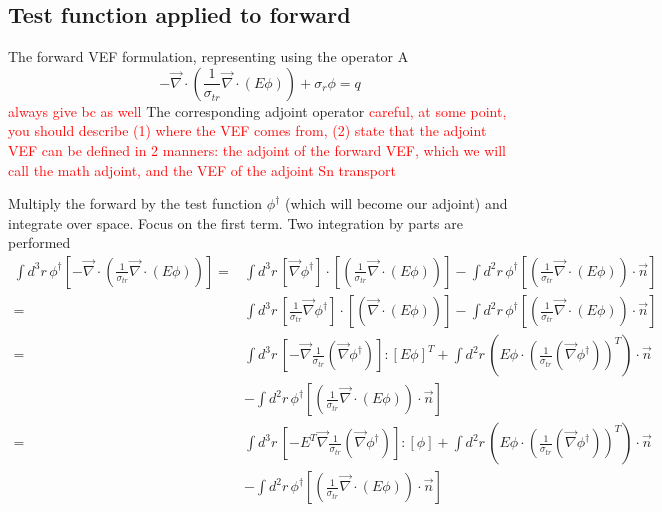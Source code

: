 \documentclass{article}
\newcommand{\vdiv}{\vec{\nabla} \cdot}
\newcommand{\vgrad}{\vec{\nabla}}
\begin{document}
\subsection{Test function applied to forward}
The forward VEF formulation, representing using the operator A
\[ -\vdiv \left( \frac{1}{\sigma_{tr}} \vdiv \left( E \phi \right) \right)
+ \sigma_r \phi
= q
\]
\textcolor{red}{always give bc as well}
The corresponding adjoint operator \textcolor{red}{careful, at some point, you should describe (1) where the VEF comes from, (2) state that the adjoint VEF can be defined in 2 manners: the adjoint of the forward VEF, which we will call the math adjoint, and the VEF of the adjoint Sn transport}


Multiply the forward by the test function $\phi^\dag$ (which will become our adjoint) and integrate over space. Focus on the first term. Two integration by parts are performed
\begin{align*}
\int d^3r \, \phi^\dag \left[  -\vdiv \left( \frac{1}{\sigma_{tr}} \vdiv \left( E \phi \right) \right) \right] 
=& \int d^3r \, \left[ \vgrad \phi^\dag \right] \cdot \left[ \left( \frac{1}{\sigma_{tr}} \vdiv \left( E \phi \right) \right) \right] 
- \int d^2 r \, \phi^\dag \left[ \left( \frac{1}{\sigma_{tr}} \vdiv \left( E \phi \right) \right) \cdot \vec{n} \right] \\
=& \int d^3r \, \left[ \frac{1}{\sigma_{tr}} \vgrad \phi^\dag \right] \cdot \left[ \left(  \vdiv \left( E \phi \right) \right) \right] 
- \int d^2 r \, \phi^\dag \left[ \left( \frac{1}{\sigma_{tr}} \vdiv \left( E \phi \right) \right) \cdot \vec{n} \right] \\
=& \int d^3r \, \left[- \vgrad \frac{1}{ \sigma_{tr}} \left(  \vgrad \phi^\dag \right) \right] : \left[ E \phi \right]^T 
+ \int d^2 r \, \left( E \phi \cdot \left( \frac{1}{ \sigma_{tr}} \left(  \vgrad \phi^\dag \right) \right)^T \right) \cdot \vec{n} \\
&- \int d^2 r \, \phi^\dag \left[ \left( \frac{1}{\sigma_{tr}} \vdiv \left( E \phi \right) \right) \cdot \vec{n} \right]\\
=& \int d^3r \, \left[- E^T \vgrad \frac{1}{ \sigma_{tr}} \left(  \vgrad \phi^\dag \right) \right] : \left[ \phi \right] 
+ \int d^2 r \, \left( E \phi \cdot \left( \frac{1}{ \sigma_{tr}} \left(  \vgrad \phi^\dag \right) \right)^T \right) \cdot \vec{n} \\
&- \int d^2 r \, \phi^\dag \left[ \left( \frac{1}{\sigma_{tr}} \vdiv \left( E \phi \right) \right) \cdot \vec{n} \right]
\end{align*}
\end{document}
